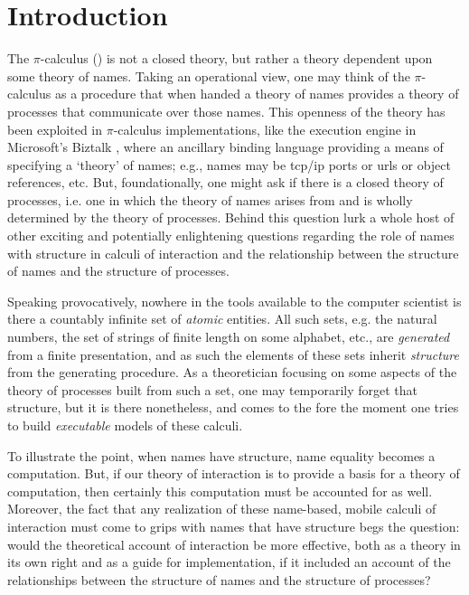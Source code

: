 \documentclass[]{amsart}
\theoremstyle{definition}
\theoremstyle{remark}
\numberwithin{equation}{subsection}
\newcommand{\pic}{$\pi$-calculus}
\begin{document}
\section{Introduction}

The {\pic} (\cite{milner91polyadicpi}) is not a closed theory, but
rather a theory dependent upon some theory of names. Taking an
operational view, one may think of the {\pic} as a procedure that when
handed a theory of names provides a theory of processes that
communicate over those names. This openness of the theory has been
exploited in {\pic} implementations, like the execution engine in
Microsoft's Biztalk \cite{biztalk}, where an ancillary binding
language providing a means of specifying a `theory' of names; e.g.,
names may be tcp/ip ports or urls or object references, etc. But,
foundationally, one might ask if there is a closed theory of
processes, i.e. one in which the theory of names arises from and is
wholly determined by the theory of processes. Behind this question
lurk a whole host of other exciting and potentially enlightening
questions regarding the role of names with structure in calculi of
interaction and the relationship between the structure of names and
the structure of processes.

Speaking provocatively, nowhere in the tools available to the computer
scientist is there a countably infinite set of \textit{atomic}
entities. All such sets, e.g. the natural numbers, the set of strings
of finite length on some alphabet, etc., are \textit{generated} from a
finite presentation, and as such the elements of these sets inherit
\textit{structure} from the generating procedure. As a theoretician
focusing on some aspects of the theory of processes built from such a
set, one may temporarily forget that structure, but it is there
nonetheless, and comes to the fore the moment one tries to build
\textit{executable} models of these calculi. 

To illustrate the point, when names have structure, name equality
becomes a computation. But, if our theory of interaction is to provide
a basis for a theory of computation, then certainly this computation
must be accounted for as well. Moreover, the fact that any realization
of these name-based, mobile calculi of interaction must come to grips
with names that have structure begs the question: would the
theoretical account of interaction be more effective, both as a theory
in its own right and as a guide for implementation, if it included an
account of the relationships between the structure of names and the
structure of processes?
\end{document}
